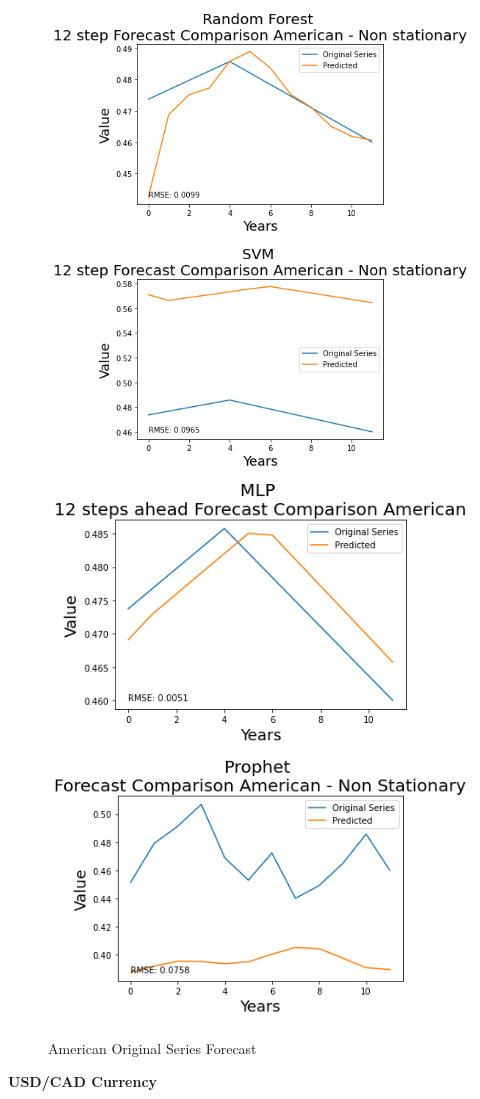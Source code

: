 \documentclass[10pt,twocolumn,letterpaper]{article}
\begin{document}
	\begin{figure}[h]
		\centering
		\includegraphics[width=0.45\linewidth]{../img/RandomForest/american_for}
		\includegraphics[width=0.45\linewidth]{../img/SVM/american_for}
		\includegraphics[width=0.45\linewidth]{../img/MLP/american_for}
		\includegraphics[width=0.45\linewidth]{../img/Prophet/american_for}
		\caption{American Original Series Forecast}
		\label{fig:americanforecast}
	\end{figure}
	
	
	\textbf{USD/CAD Currency}
	
\end{document}
